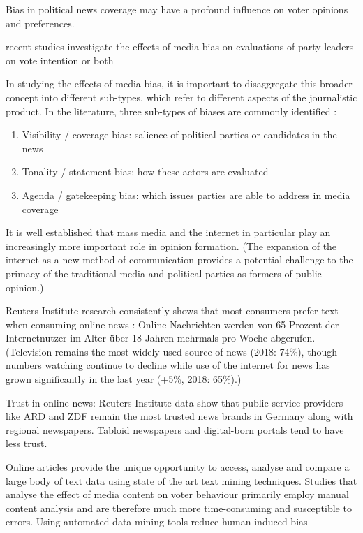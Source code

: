 \documentclass[12pt,a4paper,notitlepage]{article}
\begin{document}
Bias in political news coverage may have a profound influence on voter opinions and preferences. \citet{eberl_one_2017} 

recent studies investigate the effects of media bias on evaluations of party leaders \citep{lenz_looking_2011, prior_incumbent_2006} on vote intention \citep{boomgaarden_reporting_2007} or both \citep{druckman_impact_2005}

In studying the effects of media bias, it is important to disaggregate this broader concept into different sub-types, which refer to different aspects of the journalistic product. In the literature, three sub-types of biases are commonly identified \citep{dalessio_media_2000, eberl_one_2017, junque_de_fortuny_media_2012}:

\begin{enumerate}
	\item Visibility / coverage bias: salience of political parties or candidates in the news
	\item Tonality / statement bias: how these actors are evaluated
	\item Agenda / gatekeeping bias: which issues parties are able to address in media coverage
\end{enumerate}

It is well established that mass media and the internet in particular play an increasingly more important role in opinion formation. \citep{savigny_public_2002} (The expansion of the internet as a new method of communication provides a potential challenge to the primacy of the traditional media and political parties as formers of public opinion.)

Reuters Institute research consistently shows that most consumers prefer text when consuming online news \citep{holig_reuters_2018}: Online‐Nachrichten werden von 65 Prozent der Internetnutzer im Alter über 18 Jahren mehrmals pro Woche abgerufen. (Television remains the most widely used source of news (2018: 74\%), though numbers watching continue to decline while use of the internet for news has grown significantly in the last year (+5\%, 2018: 65\%).)

Trust in online news: Reuters Institute data show that public service providers like ARD and ZDF remain the most trusted news brands in Germany along with regional newspapers. Tabloid newspapers and digital-born portals tend to have less trust. 

Online articles provide the unique opportunity to access, analyse and compare a large body of text data using state of the art text mining techniques. Studies that analyse the effect of media content on voter behaviour primarily employ manual content analysis and are therefore much more time-consuming and susceptible to errors. Using automated data mining tools reduce human induced bias \citep{junque_de_fortuny_media_2012} 
\end{document}
